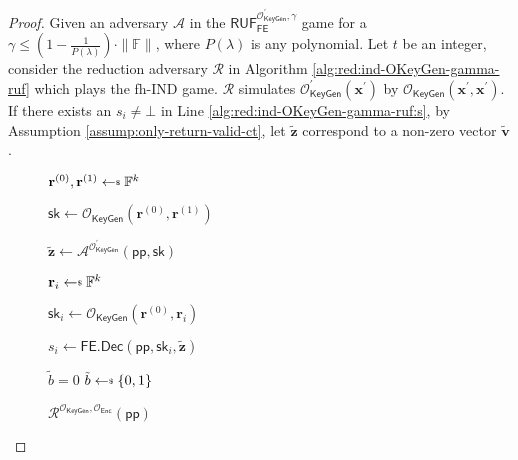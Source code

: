 \begin{proof}
Given an adversary $\mathcal{A}$ in the $\textsf{RUF}^{\mathcal{O}^\prime_{\textsf{KeyGen}}, \gamma}_{\textsf{FE}}$ game for a $\gamma \leq (1 - \frac{1}{P(\lambda)}) \cdot \|\mathbb{F}\|$, where $P(\lambda)$ is any polynomial. Let $t$ be an integer, consider the reduction adversary $\mathcal{R}$ in Algorithm \ref{alg:red:ind-OKeyGen-gamma-ruf} which plays the \textsf{fh-IND} game. $\mathcal{R}$ simulates $\mathcal{O}_\textsf{KeyGen}^\prime(\mathbf{x}^\prime)$ by $\mathcal{O}_\textsf{KeyGen}(\mathbf{x}^\prime, \mathbf{x}^\prime)$.
If there exists an $s_i \neq \bot$ in Line \ref{alg:red:ind-OKeyGen-gamma-ruf:s}, by Assumption \ref{assump:only-return-valid-ct}, let $\mathbf{\tilde{z}}$ correspond to a non-zero vector $\mathbf{\tilde{v}}$.

\begin{figure}[h]
\centering
	
	\begin{minipage}[t]{0.5\linewidth}
	\centering
	\begin{algorithm}[H]
	\caption{$\mathcal{R}^{\mathcal{O}_{\textsf{KeyGen}}, \mathcal{O}_{\textsf{Enc}}}(\textsf{pp})$}
	\label{alg:red:ind-OKeyGen-gamma-ruf}
	\begin{algorithmic}[1]
		\State $\mathbf{r}^{(0)}, \mathbf{r}^{(1)} \getsdollar \mathbb{F}^{k}$
		
		\State $\textsf{sk} \gets \mathcal{O}_{\textsf{KeyGen}}(\mathbf{r}^{(0)}, \mathbf{r}^{(1)})$ 

		\State ${\mathbf{\tilde{z}}} \gets {\mathcal{A}}^{\mathcal{O}^\prime_{\textsf{KeyGen}}} (\textsf{pp}, \textsf{sk})$

		
			\State $\mathbf{r}_i \getsdollar \mathbb{F}^{k}$

			\State $\textsf{sk}_i \gets \mathcal{O}_{\textsf{KeyGen}}(\mathbf{r}^{(0)}, \mathbf{r}_i)$

			\State $s_i \gets \textsf{FE.Dec}( \textsf{pp}, \textsf{sk}_i, \mathbf{\tilde{z}} )$ \label{alg:red:ind-OKeyGen-gamma-ruf:s}
	
		\EndFor	
		
		 \label{alg:red:ind-OKeyGen-gamma-ruf:verify}
			\State \Return $\tilde{b} = 0$
		\Else
			\State \Return $\tilde{b} \getsdollar \{0, 1\}$
		\EndIf

	\end{algorithmic}
	\end{algorithm}
	\end{minipage}
	

\end{figure}
\end{proof}
